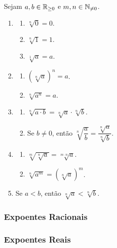\begin{theorem} \label{teo.calc1:propriedades_raizes}
    Sejam $a,b \in \mathbb{R}_{\geq 0}$ e $m,n \in \mathbb{N}_{\neq 0}$.
    \begin{enumerate}[leftmargin=*, align=left, label=\textbf{(\alph*)}]
        \item
            \begin{enumerate}[label=\roman*.]
                \item $\sqrt[n]{0} = 0$.
                \item $\sqrt[n]{1} = 1$.
                \item $\sqrt[1]{a} = a$.
            \end{enumerate}
        \item
            \begin{enumerate}[label=\roman*.]
                \item $(\sqrt[n]{a})^n = a$.
                \item $\sqrt[n]{a^n} = a$.
            \end{enumerate}
        \item
            \begin{enumerate}[label=\roman*.]
                \item $\sqrt[n]{a \cdot b} = \sqrt[n]{a} \cdot \sqrt[n]{b}$.
                \item Se $b \neq 0$, então $\sqrt[n]{\dfrac{a}{b}} = \dfrac{\sqrt[n]{a}}{\sqrt[n]{b}}$.
            \end{enumerate}
        \item
            \begin{enumerate}[label=\roman*.]
                \item $\sqrt[m]{\sqrt[n]{a}} = \sqrt[m \cdot n]{a}$.
                \item $\sqrt[n]{a^m} = (\sqrt[n]{a})^m$.
            \end{enumerate}
        \item Se $a < b$, então $\sqrt[n]{a} < \sqrt[n]{b}$.
    \end{enumerate}
\end{theorem}



\subsubsection{Expoentes Racionais}

\subsubsection{Expoentes Reais}

